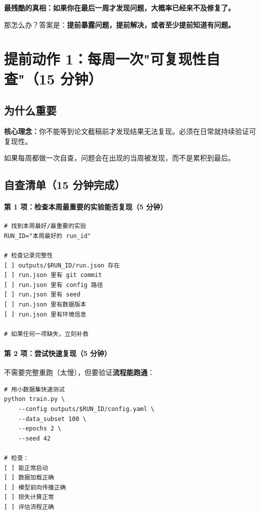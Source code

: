 \textbf{最残酷的真相：如果你在最后一周才发现问题，大概率已经来不及修复了。}

那怎么办？答案是：\textbf{提前暴露问题，提前解决，或者至少提前知道有问题。}

\section{提前动作 1：每周一次"可复现性自查"（15 分钟）}

\subsection{为什么重要}

\textbf{核心理念：}你不能等到论文截稿前才发现结果无法复现。必须在日常就持续验证可复现性。

如果每周都做一次自查，问题会在出现的当周被发现，而不是累积到最后。

\subsection{自查清单（15 分钟完成）}

\paragraph{第 1 项：检查本周最重要的实验能否复现（5 分钟）}

\begin{verbatim}
# 找到本周最好/最重要的实验
RUN_ID="本周最好的 run_id"

# 检查记录完整性
[ ] outputs/$RUN_ID/run.json 存在
[ ] run.json 里有 git commit
[ ] run.json 里有 config 路径
[ ] run.json 里有 seed
[ ] run.json 里有数据版本
[ ] run.json 里有环境信息

# 如果任何一项缺失，立刻补救
\end{verbatim}

\paragraph{第 2 项：尝试快速复现（5 分钟）}

不需要完整重跑（太慢），但要验证\textbf{流程能跑通}：

\begin{verbatim}
# 用小数据集快速测试
python train.py \
    --config outputs/$RUN_ID/config.yaml \
    --data_subset 100 \
    --epochs 2 \
    --seed 42

# 检查：
[ ] 能正常启动
[ ] 数据加载正确
[ ] 模型前向传播正确
[ ] 损失计算正常
[ ] 评估流程正确
\end{verbatim}

